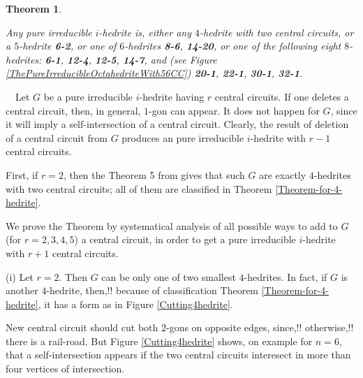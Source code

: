 \documentclass[12pt]{article}
\newtheorem{theorem}{Theorem}
\newcommand{\proof}{\noindent{\bf Proof.}\ \ }
\begin{document}
%










\begin{theorem}\label{TheOneWithSimpleCentralCircuit}

Any pure irreducible $i$-hedrite is, either any $4$-hedrite with two
central circuits, or a $5$-hedrite {\bf 6-2}, or one of $6$-hedrites
{\bf 8-6}, {\bf 14-20}, or one of the following eight $8$-hedrites:
{\bf 6-1}, {\bf 12-4}, {\bf 12-5}, {\bf 14-7}, and (see Figure 
\ref{ThePureIrreducibleOctahedriteWith56CC}) {\bf 20-1}, {\bf 22-1},
{\bf 30-1}, {\bf 32-1}.


\end{theorem}


\proof Let $G$ be a pure irreducible $i$-hedrite having $r$ central circuits. 
If one deletes a central circuit, then, in general, $1$-gon can appear. It 
does not happen for $G$, since it will imply a self-intersection of a central 
circuit. Clearly, the result of deletion of a central circuit from $G$ 
produces an pure irreducible $i$-hedrite with $r-1$ central circuits.

First, if $r=2$, then the Theorem 5 from \cite{DSt} gives that such $G$ are 
exactly $4$-hedrites with two central circuits; all of them are classified 
in Theorem \ref{Theorem-for-4-hedrite}.

We prove the Theorem by systematical analysis of all possible ways to add 
to $G$ (for $r=2,3,4,5$) a central circuit, in order to get a pure 
irreducible $i$-hedrite with $r+1$ central circuits. 


(i) Let $r=2$. Then $G$ can be only one of two smallest $4$-hedrites. In 
fact, if $G$ is another $4$-hedrite, then,!! because of classification Theorem 
\ref{Theorem-for-4-hedrite}, it has a form as in Figure \ref{Cutting4hedrite}.

New central circuit should cut both $2$-gons on opposite edges, 
since,!! otherwise,!! there is a rail-road. But Figure \ref{Cutting4hedrite} shows, on example for $n=6$, that a self-intersection appears if the two central circuits interesect in more than four vertices of intersection.
\end{document}
